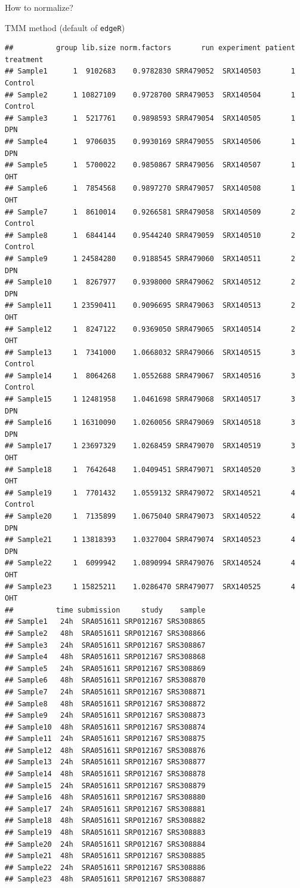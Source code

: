 \documentclass[ignorenonframetext,]{beamer}
\begin{document}
\begin{frame}[fragile]
\begin{block}{How to normalize?}
\begin{block}{TMM method (default of \texttt{edgeR})}
\begin{verbatim}
##          group lib.size norm.factors       run experiment patient treatment
## Sample1      1  9102683    0.9782830 SRR479052  SRX140503       1   Control
## Sample2      1 10827109    0.9728700 SRR479053  SRX140504       1   Control
## Sample3      1  5217761    0.9898593 SRR479054  SRX140505       1       DPN
## Sample4      1  9706035    0.9930169 SRR479055  SRX140506       1       DPN
## Sample5      1  5700022    0.9850867 SRR479056  SRX140507       1       OHT
## Sample6      1  7854568    0.9897270 SRR479057  SRX140508       1       OHT
## Sample7      1  8610014    0.9266581 SRR479058  SRX140509       2   Control
## Sample8      1  6844144    0.9544240 SRR479059  SRX140510       2   Control
## Sample9      1 24584280    0.9188545 SRR479060  SRX140511       2       DPN
## Sample10     1  8267977    0.9398000 SRR479062  SRX140512       2       DPN
## Sample11     1 23590411    0.9096695 SRR479063  SRX140513       2       OHT
## Sample12     1  8247122    0.9369050 SRR479065  SRX140514       2       OHT
## Sample13     1  7341000    1.0668032 SRR479066  SRX140515       3   Control
## Sample14     1  8064268    1.0552688 SRR479067  SRX140516       3   Control
## Sample15     1 12481958    1.0461698 SRR479068  SRX140517       3       DPN
## Sample16     1 16310090    1.0260056 SRR479069  SRX140518       3       DPN
## Sample17     1 23697329    1.0268459 SRR479070  SRX140519       3       OHT
## Sample18     1  7642648    1.0409451 SRR479071  SRX140520       3       OHT
## Sample19     1  7701432    1.0559132 SRR479072  SRX140521       4   Control
## Sample20     1  7135899    1.0675040 SRR479073  SRX140522       4       DPN
## Sample21     1 13818393    1.0327004 SRR479074  SRX140523       4       DPN
## Sample22     1  6099942    1.0890994 SRR479076  SRX140524       4       OHT
## Sample23     1 15825211    1.0286470 SRR479077  SRX140525       4       OHT
##          time submission     study    sample
## Sample1   24h  SRA051611 SRP012167 SRS308865
## Sample2   48h  SRA051611 SRP012167 SRS308866
## Sample3   24h  SRA051611 SRP012167 SRS308867
## Sample4   48h  SRA051611 SRP012167 SRS308868
## Sample5   24h  SRA051611 SRP012167 SRS308869
## Sample6   48h  SRA051611 SRP012167 SRS308870
## Sample7   24h  SRA051611 SRP012167 SRS308871
## Sample8   48h  SRA051611 SRP012167 SRS308872
## Sample9   24h  SRA051611 SRP012167 SRS308873
## Sample10  48h  SRA051611 SRP012167 SRS308874
## Sample11  24h  SRA051611 SRP012167 SRS308875
## Sample12  48h  SRA051611 SRP012167 SRS308876
## Sample13  24h  SRA051611 SRP012167 SRS308877
## Sample14  48h  SRA051611 SRP012167 SRS308878
## Sample15  24h  SRA051611 SRP012167 SRS308879
## Sample16  48h  SRA051611 SRP012167 SRS308880
## Sample17  24h  SRA051611 SRP012167 SRS308881
## Sample18  48h  SRA051611 SRP012167 SRS308882
## Sample19  48h  SRA051611 SRP012167 SRS308883
## Sample20  24h  SRA051611 SRP012167 SRS308884
## Sample21  48h  SRA051611 SRP012167 SRS308885
## Sample22  24h  SRA051611 SRP012167 SRS308886
## Sample23  48h  SRA051611 SRP012167 SRS308887
\end{verbatim}


\end{block}
\end{block}
\end{frame}
\end{document}
